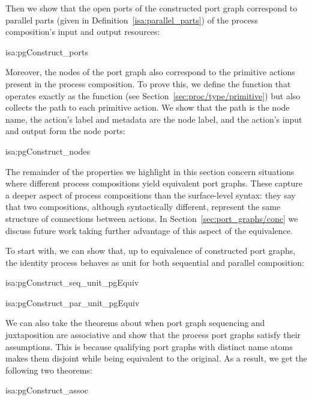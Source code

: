 \documentclass[class=smolathesis,crop=false]{standalone}
\begin{document}
Then we show that the open ports of the constructed port graph correspond to parallel parts (given in Definition~\ref{isa:parallel_parts}) of the process composition's input and output resources:
\begin{isalemma}{isa:pgConstruct_ports}
  
\end{isalemma}

Moreover, the nodes of the port graph also correspond to the primitive actions present in the process composition.
To prove this, we define the function  that operates exactly as the function  (see Section~\ref{sec:proc/type/primitive}) but also collects the path to each primitive action.
We show that the path is the node name, the action's label and metadata are the node label, and the action's input and output form the node ports:
\begin{isalemma}{isa:pgConstruct_nodes}
  
\end{isalemma}

The remainder of the properties we highlight in this section concern situations where different process compositions yield equivalent port graphs.
These capture a deeper aspect of process compositions than the surface-level syntax: they say that two compositions, although syntactically different, represent the same structure of connections between actions.
In Section~\ref{sec:port_graphs/conc} we discuss future work taking further advantage of this aspect of the equivalence.

To start with, we can show that, up to equivalence of constructed port graphs, the identity process behaves as unit for both sequential and parallel composition:
\begin{isalemma}{isa:pgConstruct_seq_unit_pgEquiv}
  
\end{isalemma}
\pagebreak
\begin{isalemma}{isa:pgConstruct_par_unit_pgEquiv}
  
\end{isalemma}

We can also take the theorems about when port graph sequencing and juxtaposition are associative and show that the process port graphs satisfy their assumptions.
This is because qualifying port graphs with distinct name atoms makes them disjoint while being equivalent to the original.
As a result, we get the following two theorems:
\begin{isalemma}{isa:pgConstruct_assoc}
  
\end{isalemma}
\end{document}
